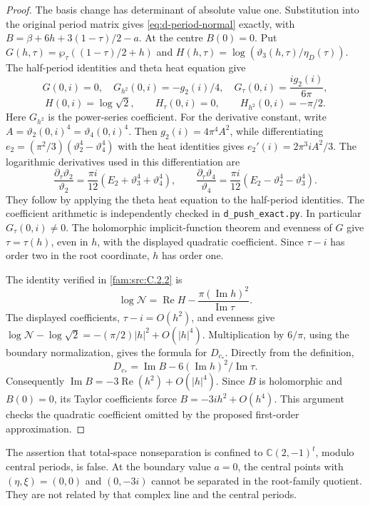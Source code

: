 \begin{proof}
The basis change has determinant of absolute value one. Substitution
into the original period matrix gives \eqref{eq:d-period-normal}
exactly, with
\(B=\beta+6h+3(1-\tau)/2-a\).
At the centre \(B(0)=0\). Put
\(G(h,\tau)=\wp_\tau((1-\tau)/2+h)\) and
\(H(h,\tau)=\log(\vartheta_3(h,\tau)/\eta_D(\tau))\).
The half-period identities and theta heat equation give
\[
 G(0,i)=0,\quad G_{h^2}(0,i)=-g_2(i)/4,\quad
 G_\tau(0,i)=\frac{i g_2(i)}{6\pi},
\]
\[
 H(0,i)=\log\sqrt2,\qquad H_\tau(0,i)=0,\qquad
 H_{h^2}(0,i)=-\pi/2.
\]
Here \(G_{h^2}\) is the power-series coefficient. For the derivative
constant, write \(A=\vartheta_2(0,i)^4=\vartheta_4(0,i)^4\).
Then \(g_2(i)=4\pi^4A^2\), while differentiating
\(e_2=(\pi^2/3)(\vartheta_2^4-\vartheta_4^4)\) with the heat
identities gives \(e_2'(i)=2\pi^3iA^2/3\).
The logarithmic derivatives used in this differentiation are
\[
 \frac{\partial_\tau\vartheta_2}{\vartheta_2}
  =\frac{\pi i}{12}(E_2+\vartheta_3^4+\vartheta_4^4),\qquad
 \frac{\partial_\tau\vartheta_4}{\vartheta_4}
  =\frac{\pi i}{12}(E_2-\vartheta_2^4-\vartheta_3^4).
\]
They follow by applying the theta heat equation to the half-period
identities. The coefficient arithmetic is independently checked in
\texttt{d\_push\_exact.py}. In particular \(G_\tau(0,i)\ne0\).
The holomorphic implicit-function theorem and evenness of \(G\) give
\(\tau=\tau(h)\), even in \(h\), with the displayed quadratic
coefficient. Since \(\tau-i\) has order two in the root coordinate,
\(h\) has order one.

The identity verified in \cref{fam:src:C.2.2} is
\[
 \log\mathcal N=\operatorname{Re}H-
       \frac{\pi(\operatorname{Im}h)^2}{\operatorname{Im}\tau}.
\]
The displayed coefficients, \(\tau-i=O(h^2)\), and evenness give
\(\log\mathcal N-\log\sqrt2=-(\pi/2)|h|^2+O(|h|^4)\).
Multiplication by \(6/\pi\), using the boundary normalization, gives
the formula for \(D_{c_*}\). Directly from the definition,
\[
 D_{c_*}=\operatorname{Im}B-
             6(\operatorname{Im}h)^2/\operatorname{Im}\tau.
\]
Consequently \(\operatorname{Im}B=-3\operatorname{Re}(h^2)
+O(|h|^4)\). Since \(B\) is holomorphic and \(B(0)=0\), its Taylor
coefficients force \(B=-3ih^2+O(h^4)\). This argument checks the
quadratic coefficient omitted by the proposed first-order approximation.
\end{proof}

\begin{proposition}\label{push:src:D.2.2}
The assertion that total-space nonseparation is confined to
\(\mathbb C(2,-1)^t\), modulo central periods, is false. At the
boundary value \(a=0\), the central points with \((\eta,\xi)=(0,0)\)
and \((0,-3i)\) cannot be separated in the root-family quotient.
They are not related by that complex line and the central periods.
\end{proposition}

